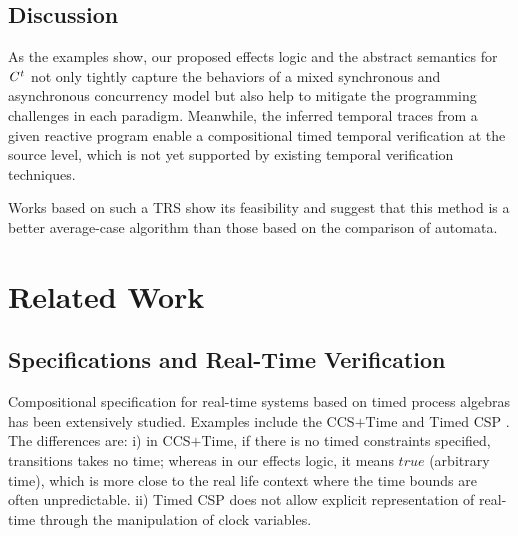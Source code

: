 \documentclass[acmsmall,10pt,review]{acmart}
\newcommand{\code}[1]{{\tt{\ensuremath{\m{#1}}}}}
\newcommand{\m}{\mathit}
\newcommand{\timedL}{\code{C^{t}}}
\begin{document}
{{{\subsection{Discussion}

As the examples show, our proposed effects logic and the abstract semantics for \code{\timedL} not only tightly capture the behaviors of a mixed synchronous and asynchronous concurrency model but also help to mitigate the programming challenges in each paradigm. Meanwhile, the inferred temporal traces from a given reactive program enable a compositional timed temporal verification at the source level, which is not yet supported by existing temporal verification techniques. 



Works based on such a TRS \cite{DBLP:conf/icfem/SongC20,DBLP:conf/vmcai/SongC21,DBLP:journals/tcs/AntimirovM95,DBLP:journals/ijfcs/AlmeidaMR09,DBLP:conf/fsttcs/KeilT14,DBLP:journals/jcss/Hovland12,prisacariu2010synchronous}  show its feasibility and suggest that this method is a better average-case algorithm than those based on the comparison of automata. 



\section{Related Work}\label{sec:Related_work}





\subsection{Specifications and Real-Time Verification}






Compositional specification for real-time systems based on timed process algebras has been extensively studied. Examples include the CCS\code{\text{+}}Time \cite{DBLP:conf/icalp/Yi91} and Timed CSP \cite{DBLP:journals/tse/DongHQSY08}.  
The differences are: 
i) in CCS\code{\text{+}}Time, if there is no timed constraints specified, transitions takes no time; whereas in our effects logic, it means \code{true} (arbitrary time), which is more close to the real life context where the time bounds are often unpredictable.
ii) Timed CSP does not allow explicit representation of real-time through the manipulation of clock variables.

}}}
\end{document}
